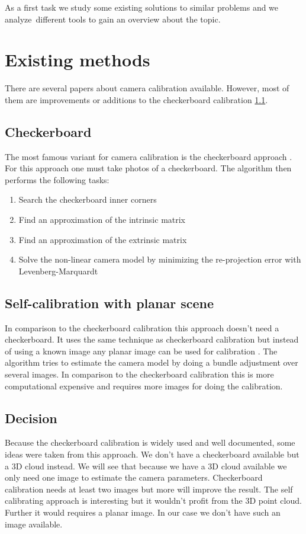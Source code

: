 \documentclass[11pt,a4paper,titlepage,oneside]{report}
\begin{document}
As a first task we study some existing solutions to similar problems and we analyze different tools to gain an overview about the topic.

\section{Existing methods}

There are several papers about camera calibration available. However, most of them are improvements or additions to the checkerboard calibration \ref{sec:checkerboard}.

\subsection{Checkerboard}\label{sec:checkerboard}
The most famous variant for camera calibration is the checkerboard approach \cite{Zhang}. For this approach one must take photos of a checkerboard. The algorithm then performs the following tasks:
\begin{enumerate}
  \item Search the checkerboard inner corners
  \item Find an approximation of the intrinsic matrix
  \item Find an approximation of the extrinsic matrix
  \item Solve the non-linear camera model by minimizing the re-projection error with Levenberg-Marquardt
\end{enumerate}

\subsection{Self-calibration with planar scene}
In comparison to the checkerboard calibration this approach doesn't need a checkerboard. It uses the same technique as checkerboard calibration but instead of using a known image any planar image can be used for calibration \cite{selfcalib}. The algorithm tries to estimate the camera model by doing a bundle adjustment over several images. In comparison to the checkerboard calibration this is more computational expensive and requires more images for doing the calibration.

\subsection{Decision}
Because the checkerboard calibration is widely used and well documented, some ideas were taken from this approach. We don't have a checkerboard available but a 3D cloud instead. We will see that because we have a 3D cloud available we only need one image to estimate the camera parameters. Checkerboard calibration needs at least two images \cite{Zhang} but more will improve the result. The self calibrating approach is interesting but it wouldn't profit from the 3D point cloud. Further it would requires a planar image. In our case we don't have such an image available.
\end{document}
